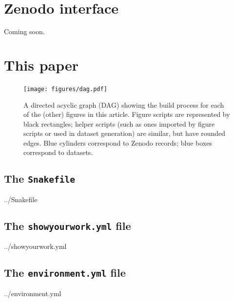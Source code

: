 \documentclass[twocolumn]{aastex631}
\begin{document}
\section{Zenodo interface}
\label{sec:zenodo}
%
Coming soon.

\section{This paper}

\begin{figure}[p!]
    \begin{centering}
        \texttt{[image: figures/dag.pdf]}
        \caption{
            A directed acyclic graph (DAG) showing the build process for each of the (other) figures in this article. 
            Figure scripts are represented by black rectangles; helper scripts (such as ones imported by figure scripts or used in dataset generation) are similar, but have rounded edges.
            Blue cylinders correspond to Zenodo records; blue boxes correspond to datasets.
        }
        \label{fig*:dag}
    \end{centering}
\end{figure}

\subsection{The \texttt{Snakefile}}
\label{sec:Snakefile}
%
\begin{minipage}{\linewidth}

{../Snakefile}
\end{minipage}

\subsection{The \texttt{showyourwork.yml} file}
\label{sec:showyourworkyml}
%
\begin{minipage}{\linewidth}

{../showyourwork.yml}
\end{minipage}

\subsection{The \texttt{environment.yml} file}
\label{sec:environmentyml}
%
\begin{minipage}{\linewidth}

{../environment.yml}
\end{minipage}


\end{document}
